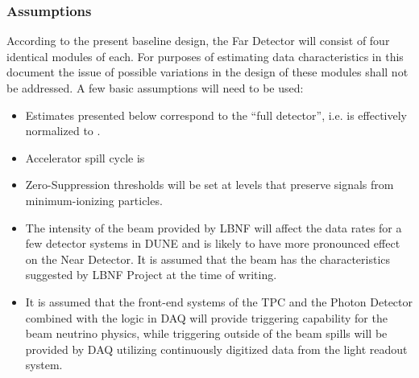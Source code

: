 \subsubsection{Assumptions}
\label{sec:detectors-sc-infrastructure-assumptions}
According to the present baseline design, the Far Detector will
consist of four identical modules of \tpcmodulemass each.  For
purposes of estimating data characteristics in this document the issue
of possible variations in the design of these modules shall not be
addressed. A few basic assumptions will need to be used:
\begin{itemize}
\item Estimates presented below correspond to the ``full detector'',
  i.e. is effectively normalized to \dunedetectormass.
\item Accelerator spill cycle is \beamspillcycle
\item Zero-Suppression thresholds will be set at levels that preserve
  signals from minimum-ionizing particles.
\item The intensity of the beam provided by LBNF will affect the data
  rates for a few detector systems in DUNE and is likely to have more
  pronounced effect on the Near Detector.  It is assumed that the beam
  has the characteristics suggested by LBNF Project at the time of
  writing. 
\item It is assumed that the front-end systems of the TPC and the
  Photon Detector combined with the logic in DAQ will provide
  triggering capability for the beam neutrino physics, while
  triggering outside of the beam spills will be provided by DAQ
  utilizing continuously digitized data from the light readout system.
\end{itemize}


